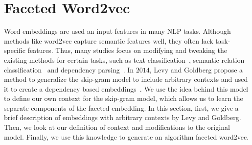 \section{Faceted Word2vec}\label{sec:faceted_word2vec}
Word embeddings are used an input features in many NLP tasks. Although methods like word2vec capture semantic features well, they often lack task-specific features. Thus, many studies focus on modifying and tweaking the existing methods for certain tasks, such as text classification~, semantic relation classification~ and dependency parsing~. In $2014$, Levy and Goldberg propose a method to generalize the skip-gram model to include arbitrary contexts and used it to create a dependency based embeddings~. We use the idea behind this model to define our own context for the skip-gram model, which allows us to learn the separate components of the faceted embedding. In this section, first, we give a brief description of embeddings with arbitrary contexts by Levy and Goldberg. Then, we look at our definition of context and modifications to the original model. Finally, we use this knowledge to generate an algorithm faceted word2vec. 
